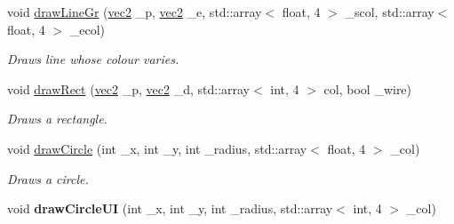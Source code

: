 \begin{DoxyCompactItemize}
\item 
void \hyperlink{classrenderer_a3564517ce29f05e45b881a4c8afa3f96}{draw\-Line\-Gr} (\hyperlink{structvec2}{vec2} \-\_\-p, \hyperlink{structvec2}{vec2} \-\_\-e, std\-::array$<$ float, 4 $>$ \-\_\-scol, std\-::array$<$ float, 4 $>$ \-\_\-ecol)
\begin{DoxyCompactList}\small\item\em Draws line whose colour varies. \end{DoxyCompactList}\item 
void \hyperlink{classrenderer_afc96317d24e4c0210053dffc0d191d6e}{draw\-Rect} (\hyperlink{structvec2}{vec2} \-\_\-p, \hyperlink{structvec2}{vec2} \-\_\-d, std\-::array$<$ int, 4 $>$ col, bool \-\_\-wire)
\begin{DoxyCompactList}\small\item\em Draws a rectangle. \end{DoxyCompactList}\item 
void \hyperlink{classrenderer_a575e3c10997f1fe8ec941dfa1e4efd01}{draw\-Circle} (int \-\_\-x, int \-\_\-y, int \-\_\-radius, std\-::array$<$ float, 4 $>$ \-\_\-col)
\begin{DoxyCompactList}\small\item\em Draws a circle. \end{DoxyCompactList}\item 
\hypertarget{classrenderer_a93e0d322c1bace835ccf19f3f6bc184d}{void {\bfseries draw\-Circle\-U\-I} (int \-\_\-x, int \-\_\-y, int \-\_\-radius, std\-::array$<$ int, 4 $>$ \-\_\-col)}\label{classrenderer_a93e0d322c1bace835ccf19f3f6bc184d}


\end{DoxyCompactItemize}
